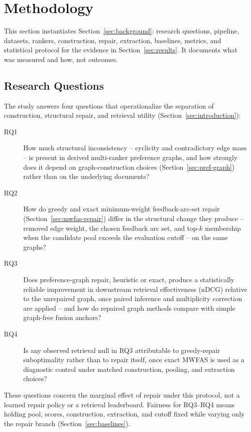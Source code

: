 \documentclass[pdflatex,sn-basic,Numbered]{sn-jnl}
\begin{document}
\section{Methodology}
\label{sec:experimental_setup}

This section instantiates Section~\ref{sec:background}: research questions,
pipeline, datasets, rankers, construction, repair, extraction, baselines,
metrics, and statistical protocol for the evidence in
Section~\ref{sec:results}. It documents what was measured and how, not
outcomes.

\subsection{Research Questions}
\label{sec:rqs}

The study answers four questions that operationalize the separation of
construction, structural repair, and retrieval utility
(Section~\ref{sec:introduction}):

\begin{description}
  \item[RQ1] How much structural inconsistency -- cyclicity and
    contradictory edge mass -- is present in derived multi-ranker
    preference graphs, and how strongly does it depend on graph-construction
    choices (Section~\ref{sec:pref-graph}) rather than on the underlying
    documents?
  \item[RQ2] How do greedy and exact minimum-weight feedback-arc-set repair
    (Section~\ref{sec:mwfas-repair}) differ in the structural change they
    produce -- removed edge weight, the chosen feedback arc set, and
    top-$k$ membership when the candidate pool exceeds the evaluation
    cutoff -- on the same graphs?
  \item[RQ3] Does preference-graph repair, heuristic or exact, produce a
    statistically reliable improvement in downstream retrieval
    effectiveness (nDCG) relative to the unrepaired graph, once paired
    inference and multiplicity correction are applied -- and how do
    repaired graph methods compare with simple graph-free fusion anchors?
  \item[RQ4] Is any observed retrieval null in RQ3 attributable to
    greedy-repair suboptimality rather than to repair itself, once exact
    MWFAS is used as a diagnostic control under matched construction,
    pooling, and extraction choices?
\end{description}

These questions concern the marginal effect of repair under this protocol,
not a learned repair policy or a retrieval leaderboard. Fairness for
RQ3--RQ4 means holding pool, scores, construction, extraction, and cutoff
fixed while varying only the repair branch
(Section~\ref{sec:baselines}).
\end{document}
